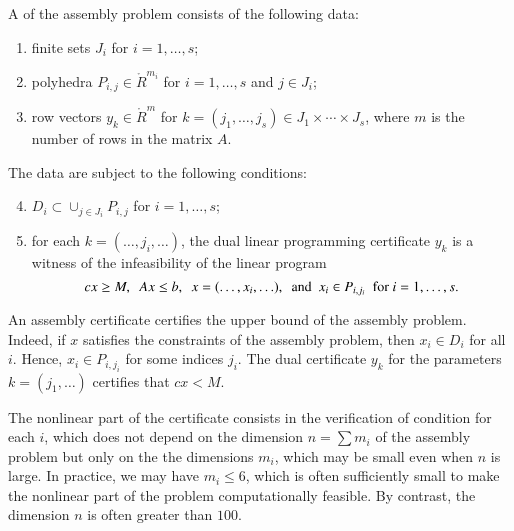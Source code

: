 \begin{definition}
A  of the assembly problem 
consists of the following data:
\begin{enumerate}
\item finite sets $J_i$ for $i=1,\ldots,s$;
\item polyhedra $P_{i,j}\in\ring{R}^{m_i}$ for $i=1,\ldots,s$ and $j\in J_i$;
\item row vectors $y_k\in\ring{R}^m$ for $k=(j_1,\ldots,j_s)\in J_1\times\cdots\times J_s$,
  where $m$ is the number of rows in the matrix $A$.
\end{enumerate}
The data are subject to the following conditions:
\begin{enumerate}
\setcounter{enumi}{3}
\item \label{eqn:DP}
$D_i \subset\cup_{j\in J_i} P_{i,j}$ for $i=1,\ldots,s$;
\item for each $k=(\ldots,j_i,\ldots)$, the dual linear programming certificate $y_k$
is a witness of the infeasibility of the linear program
\[
c x \ge M,\ \  A x \le b,\ \   x=(\ldots,x_i,\ldots),\textand x_i\in P_{i,j_i}\text{\ \ for\ }  i=1,\ldots,s.
\]
\end{enumerate}
\end{definition}

\begin{remark}
An assembly certificate certifies the upper bound
of the assembly problem.  Indeed, if $x$ satisfies the
constraints of the assembly problem, then $x_i\in D_i$ for all
$i$.  Hence, $x_i\in P_{i,j_i}$ for some indices $j_i$.  The dual
certificate $y_k$ for the parameters $k=(j_1,\ldots)$  certifies that $c x < M$.
\end{remark}

\begin{remark}
The nonlinear part of the certificate consists in the verification
of condition  for each $i$, which does not depend on the dimension $n=\sum m_i$
of the assembly problem but only on the
the dimensions $m_i$, which may be small even when $n$ is large.
In practice, we may have $m_i\le 6$, which is often sufficiently small to make the
nonlinear part of the problem computationally feasible.
By contrast,  the dimension $n$ is often greater than $100$.
\end{remark}

